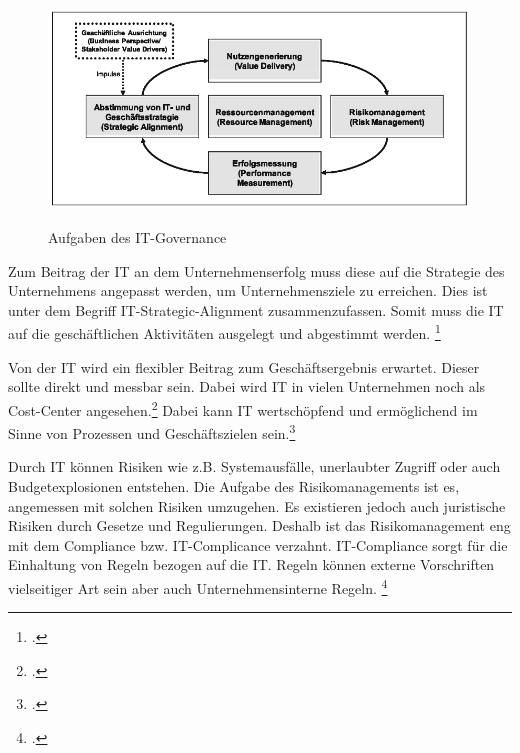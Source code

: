 \begin{figure}[hbt]
\centering
\begin{minipage}[t]{1\textwidth} %
\caption{Aufgaben des IT-Governance} %
\includegraphics[width=1\textwidth]{img/Aufgabe_IT-Governance.png}\\
\label{fig:it-governance_aufgaben}
\end{minipage}
\end{figure}

Zum Beitrag der IT an dem Unternehmenserfolg muss diese auf die Strategie des Unternehmens angepasst werden, um Unternehmensziele zu erreichen. Dies ist unter dem Begriff IT-Strategic-Alignment zusammenzufassen. Somit muss die IT auf die geschäftlichen Aktivitäten ausgelegt und abgestimmt werden. \footcite[Vgl.][9]{johannsen_it-governance_2006}

Von der IT wird ein flexibler Beitrag zum Geschäftsergebnis erwartet. Dieser sollte direkt und messbar sein. Dabei wird IT in vielen Unternehmen noch als Cost-Center angesehen.\footcite[Vgl.][7]{johannsen_it-governance_2006}
  Dabei kann IT wertschöpfend und ermöglichend im Sinne von Prozessen und Geschäftszielen sein.\footcite[Vgl.][358]{hofmann_it-governance_2010}

Durch IT können Risiken wie z.B. Systemausfälle, unerlaubter Zugriff oder auch Budgetexplosionen entstehen. Die Aufgabe des Risikomanagements ist es, angemessen mit solchen Risiken umzugehen. Es existieren jedoch auch juristische Risiken durch Gesetze und Regulierungen. Deshalb ist das Risikomanagement eng mit dem Compliance bzw. IT-Complicance verzahnt. IT-Compliance sorgt für die Einhaltung von Regeln bezogen auf die IT. Regeln können externe Vorschriften vielseitiger Art sein aber auch Unternehmensinterne Regeln. \footcite[Vgl.][359\psq]{hofmann_it-governance_2010}


